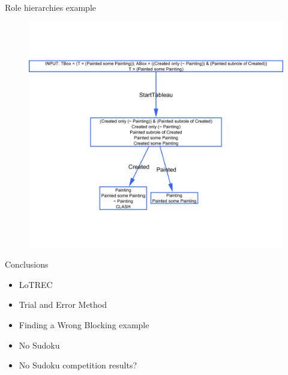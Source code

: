 \documentclass{beamer}
\begin{document}
\begin{frame}{Role hierarchies example}

\begin{figure}
\begin{center}
\includegraphics[scale=0.27]{premodelmetsubrole}
\end{center}
\end{figure}

\end{frame}



\begin{frame}{Conclusions}
\begin{itemize}
\item LoTREC \frownie
\item Trial and Error Method \frownie
\item Finding a Wrong Blocking example \frownie
\item No Sudoku \frownie
\item No Sudoku competition results? \frownie
\end{itemize}
 
\end{frame}
\end{document}
